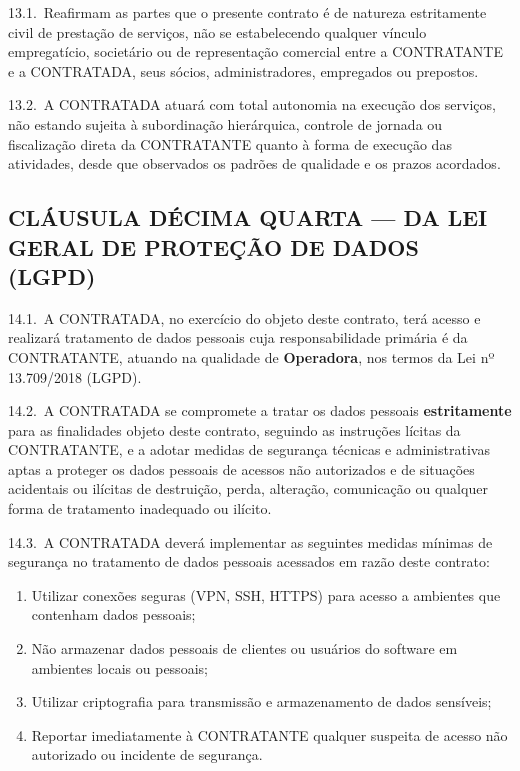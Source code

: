\documentclass[11pt, a4paper]{article}
\begin{document}
13.1.\ Reafirmam as partes que o presente contrato é de natureza estritamente civil de prestação de serviços, não se estabelecendo qualquer vínculo empregatício, societário ou de representação comercial entre a CONTRATANTE e a CONTRATADA, seus sócios, administradores, empregados ou prepostos.

13.2.\ A CONTRATADA atuará com total autonomia na execução dos serviços, não estando sujeita à subordinação hierárquica, controle de jornada ou fiscalização direta da CONTRATANTE quanto à forma de execução das atividades, desde que observados os padrões de qualidade e os prazos acordados.

\subsection{CLÁUSULA DÉCIMA QUARTA — DA LEI GERAL DE PROTEÇÃO DE DADOS (LGPD)}

14.1.\ A CONTRATADA, no exercício do objeto deste contrato, terá acesso e realizará tratamento de dados pessoais cuja responsabilidade primária é da CONTRATANTE, atuando na qualidade de \textbf{Operadora}, nos termos da Lei nº 13.709/2018 (LGPD).

14.2.\ A CONTRATADA se compromete a tratar os dados pessoais \textbf{estritamente} para as finalidades objeto deste contrato, seguindo as instruções lícitas da CONTRATANTE, e a adotar medidas de segurança técnicas e administrativas aptas a proteger os dados pessoais de acessos não autorizados e de situações acidentais ou ilícitas de destruição, perda, alteração, comunicação ou qualquer forma de tratamento inadequado ou ilícito.

14.3.\ A CONTRATADA deverá implementar as seguintes medidas mínimas de segurança no tratamento de dados pessoais acessados em razão deste contrato:

\begin{enumerate}[label=\alph*), leftmargin=1.8em]
    \item Utilizar conexões seguras (VPN, SSH, HTTPS) para acesso a ambientes que contenham dados pessoais;
    \item Não armazenar dados pessoais de clientes ou usuários do software em ambientes locais ou pessoais;
    \item Utilizar criptografia para transmissão e armazenamento de dados sensíveis;
    \item Reportar imediatamente à CONTRATANTE qualquer suspeita de acesso não autorizado ou incidente de segurança.
\end{enumerate}
\end{document}
